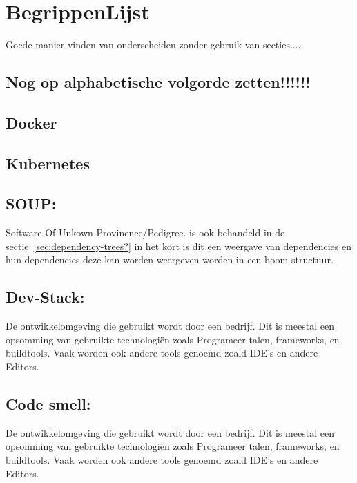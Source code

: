 
\chapter{BegrippenLijst}\label{ch:begrippenlijst}




Goede manier vinden van onderscheiden zonder gebruik van secties....

\section*{Nog op alphabetische volgorde zetten!!!!!!}\label{sec:nog-op-alphabetische-volgorde-zetten!!!!!!}

\section{Docker}
\section{Kubernetes}

\section{SOUP:}\label{sec:soup:} Software Of Unkown Provinence/Pedigree. is ook behandeld in de sectie~\ref{sec:dependency-trees?} in het kort is dit een weergave van dependencies en hun dependencies deze kan worden weergeven worden in een boom structuur.
\smallskip

\section{Dev-Stack:}\label{sec:dev-stack:} De ontwikkelomgeving die gebruikt wordt door een bedrijf. Dit is meestal een opsomming van gebruikte technologiën zoals Programeer talen, frameworks, en buildtools. Vaak worden ook andere tools genoemd zoald IDE's en andere Editors.
\smallskip

\section{Code smell:}\label{sec:code-smell:} De ontwikkelomgeving die gebruikt wordt door een bedrijf. Dit is meestal een opsomming van gebruikte technologiën zoals Programeer talen, frameworks, en buildtools. Vaak worden ook andere tools genoemd zoald IDE's en andere Editors.
\smallskip

